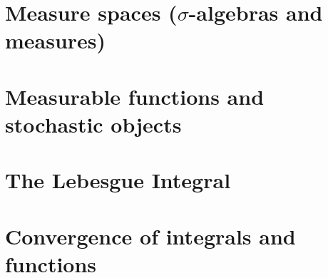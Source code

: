 \documentclass{lecturenotes}
\begin{document}
\chapter{Measure spaces ($\sigma$-algebras and measures)}
\label{chapter:sigma_algebras}


\chapter{Measurable functions and stochastic objects}
\label{chapter:measurable_functions}


\chapter{The Lebesgue Integral}
\label{chapter:integration}


\chapter{Convergence of integrals and functions}
\label{chapter:convergence}


%
%
%
%
%

%
\end{document}
